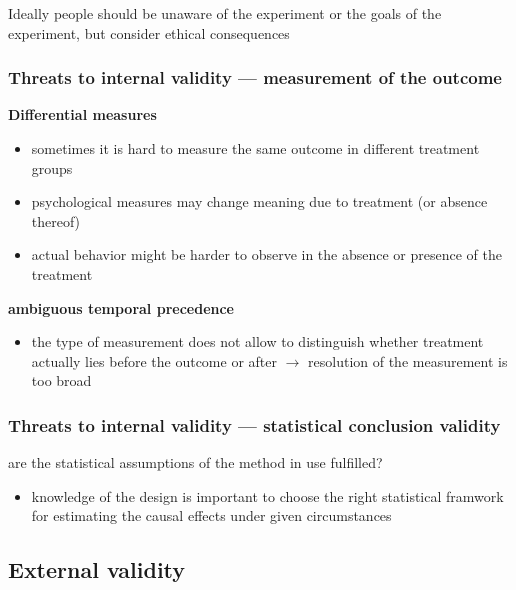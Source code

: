 \documentclass[10pt]{article}
\begin{document}
Ideally people should be unaware of the experiment or the goals of the experiment, but consider ethical consequences 
\subsubsection{Threats to internal validity --- measurement of the outcome}
\textbf{Differential measures}
\begin{itemize}
    \item sometimes it is hard to measure the same outcome in different treatment groups
    \item psychological measures may change meaning due to treatment (or absence thereof)
    \item actual behavior might be harder to observe in the absence or presence of the treatment
\end{itemize}
\textbf{ambiguous temporal precedence}
\begin{itemize}
    \item the type of measurement does not allow to distinguish whether treatment actually lies before the outcome or after $\to $ resolution of the measurement is too broad
\end{itemize}
\subsubsection{Threats to internal validity --- statistical conclusion validity}
are the statistical assumptions of the method in use fulfilled?
\begin{itemize}
    \item knowledge of the design is important to choose the right statistical framwork for estimating the causal effects under given circumstances 
\end{itemize}
\newpage 
\subsection{External validity}
\end{document}
